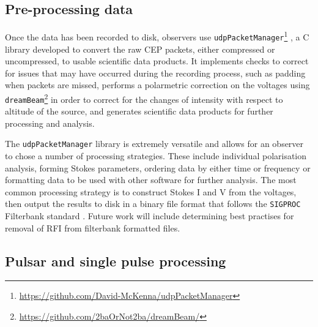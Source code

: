 \subsection{Pre-processing data}
\label{sec:baseproc}%
Once the data has been recorded to disk, observers use \texttt{udpPacketManager}\footnote{\hyperref[udpPacketManager]{https://github.com/David-McKenna/udpPacketManager}} \citep{McKenna2020}, a C library developed to convert the raw CEP packets, either compressed or uncompressed, to usable scientific data products. It implements checks to correct for issues that may have occurred during the recording process, such as padding when packets are missed, performs a polarmetric correction on the voltages using \texttt{dreamBeam}\footnote{\hyperref[dreamBeam]{https://github.com/2baOrNot2ba/dreamBeam/}} in order to correct for the changes of intensity with respect to altitude of the source, and generates scientific data products for further processing and analysis.

The \texttt{udpPacketManager} library is extremely versatile and allows for an observer to chose a number of processing strategies. These include individual polarisation analysis, forming Stokes parameters, ordering data by either time or frequency or formatting data to be used with other software for further analysis. The most common processing strategy is to construct Stokes I and V from the voltages, then output the results to disk in a binary file format that follows the \texttt{SIGPROC} Filterbank standard \citep{Lorimer2011}. Future work will include determining best practises for removal of RFI from filterbank formatted files.


\subsection{Pulsar and single pulse processing}
\label{sec:pulsarproc}


